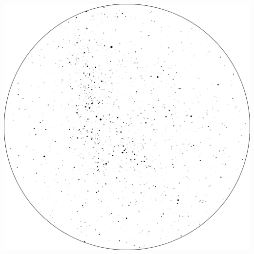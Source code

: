 \documentclass{SAS-class-skygen}
\begin{document}
	\vspace{0.5cm}
    \begin{center}
    \includegraphics[width=\textwidth]{./pics/sky_chart12.png}
    \end{center}
    
    
\end{document}
